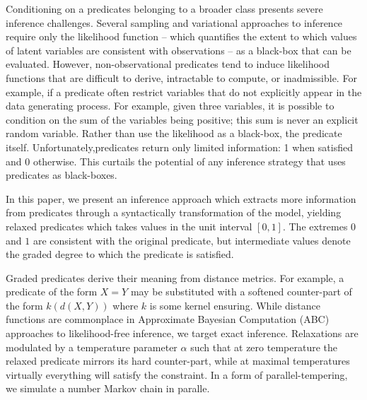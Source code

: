 


Conditioning on a predicates belonging to a broader class presents severe inference challenges.
Several sampling  \citep{andrieu2003introduction} and variational  \citep{jordan1999introduction, ranganath2014black} approaches to inference require only the likelihood function -- which quantifies the extent to which values of latent variables are consistent with observations -- as a black-box that can be evaluated.
However, non-observational predicates tend to induce likelihood functions that are difficult to derive, intractable to compute, or inadmissible.
For example, if a	predicate often restrict variables that do not explicitly appear in the data generating process.
For example, given three variables, it is possible to condition on the sum
of the variables being positive; this sum is never an explicit random variable.
Rather than use the likelihood as a black-box, the predicate itself.  Unfortunately,predicates return only limited information: 1 when satisfied and 0 otherwise.
This curtails the potential of any inference strategy that uses predicates as black-boxes.

In this paper, we present an inference approach which extracts more information from predicates through a syntactically transformation of the model, yielding relaxed predicates which takes values in the unit interval $[0, 1]$. The extremes $0$ and $1$ are consistent with the original predicate, but intermediate values denote the graded degree to which the predicate is satisfied.

Graded predicates derive their meaning from distance metrics.
For example, a predicate of the form $X = Y$ may be substituted with a softened counter-part of the form $k(d(X, Y))$ where $k$ is some kernel ensuring.
While distance functions are commonplace in Approximate Bayesian Computation (ABC) approaches to likelihood-free inference, we target exact inference.
Relaxations are modulated by a temperature parameter $\alpha$ such that at zero temperature the relaxed predicate mirrors its hard counter-part, while at maximal temperatures virtually everything will satisfy the constraint.
In a form of parallel-tempering, we simulate a number Markov chain in paralle.

